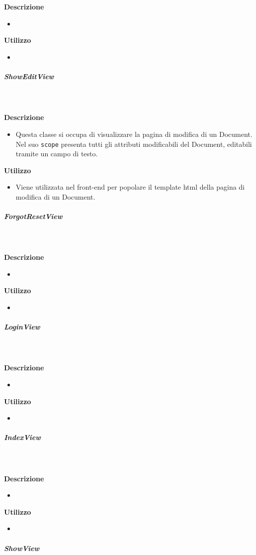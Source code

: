 				\textbf{\\ \\ Descrizione} 
					\begin{itemize}
						\item[] 
					\end{itemize}      
				\textbf{Utilizzo}  
					\begin{itemize}
						\item[] 
					\end{itemize}
			\subparagraph{ShowEditView}
				
				\textbf{\\ \\ Descrizione} 
					\begin{itemize}
						\item[] Questa classe si occupa di visualizzare la pagina di modifica di un Document. Nel suo \texttt{scope} presenta tutti gli attributi modificabili del Document, editabili tramite un campo di testo.
					\end{itemize}      
				\textbf{Utilizzo}  
					\begin{itemize}
						\item[] Viene utilizzata nel front-end per popolare il template html della pagina di modifica di un Document.
					\end{itemize}
			\subparagraph{ForgotResetView}
				
				\textbf{\\ \\ Descrizione} 
					\begin{itemize}
						\item[] 
					\end{itemize}      
				\textbf{Utilizzo}  
					\begin{itemize}
						\item[] 
					\end{itemize}
			\subparagraph{LoginView}
				
				\textbf{\\ \\ Descrizione} 
					\begin{itemize}
						\item[] 
					\end{itemize}      
				\textbf{Utilizzo}  
					\begin{itemize}
						\item[] 
					\end{itemize}
			\subparagraph{IndexView}
				
				\textbf{\\ \\ Descrizione} 
					\begin{itemize}
						\item[] 
					\end{itemize}      
				\textbf{Utilizzo}  
					\begin{itemize}
						\item[] 
					\end{itemize}
			\subparagraph{ShowView}
				
